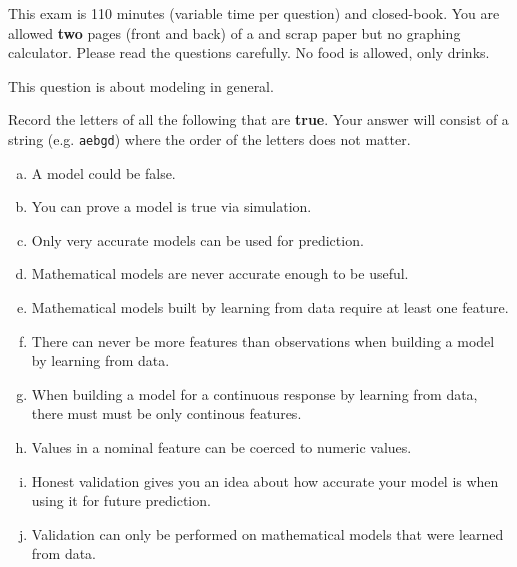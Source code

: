 \documentclass[12pt]{article}
\begin{document}
This exam is 110 minutes (variable time per question) and closed-book. You are allowed \textbf{two} pages (front and back) of a  and scrap paper but no graphing calculator. Please read the questions carefully. No food is allowed, only drinks. %

\pagebreak

\problem [7min] This question is about modeling in general. 

\benum

 Record the letters of all the following that are \textbf{true}. Your answer will consist of a string (e.g. \texttt{aebgd}) where the order of the letters does not matter.

\begin{enumerate}[(a)]
\item A model could be false.
\item You can prove a model is true via simulation.
\item Only very accurate models can be used for prediction.
\item Mathematical models are never accurate enough to be useful.
\item Mathematical models built by learning from data require at least one feature. 
\item There can never be more features than observations when building a model by learning from data.
\item When building a model for a continuous response by learning from data, there must must be only continous features.
\item Values in a nominal feature can be coerced to numeric values.
\item Honest validation gives you an idea about how accurate your model is when using it for future prediction.
\item Validation can only be performed on mathematical models that were learned from data.
\end{enumerate}
\eenum\pagebreak
\end{document}
